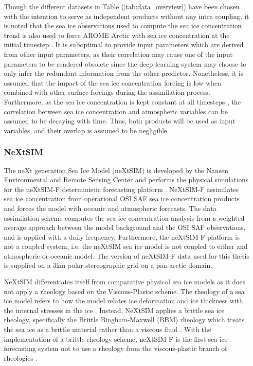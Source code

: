 \documentclass[../main/thesis.tex]{subfiles}
\begin{document}
Though the different datasets in Table (\ref{tab:data_overview}) have been chosen with the intention to serve as independent products without any intra coupling, it is noted that the sea ice observations used to compute the sea ice concentration trend \citep{Tonboe2017} is also used to force AROME Arctic with sea ice concentration at the initial timestep \citep{Mueller2017}. It is suboptimal to provide input parameters which are derived from other input parameters, as their correlation may cause one of the input parameters to be rendered obsolete since the deep learning system may choose to only infer the redundant information from the other predictor. Nonetheless, it is assumed that the impact of the sea ice concentration forcing is low when combined with other surface forcings during the assimilation process. Furthermore, as the sea ice concentration is kept constant at all timesteps \citep{Mueller2017}, the correlation between sea ice concentration and atmospheric variables can be assumed to be decaying with time. Thus, both products will be used as input variables, and their overlap is assumed to be negligible.


\subsubsection{NeXtSIM}
\label{sec:nextsim}
The neXt generation Sea Ice Model (neXtSIM) is developed by the Nansen Environmental and Remote Sensing Center and performs the physical simulations for the neXtSIM-F deterministic forecasting platform \citep{Williams2021}. NeXtSIM-F assimilates sea ice concentration from operational OSI SAF sea ice concentration products \citep{Tonboe2017, Lavelle2016} and forces the model with oceanic and atmospheric forecasts. The data assimilation scheme computes the sea ice concentration analysis from a weighted average approach between the model background and the OSI SAF observations, and is applied with a daily frequency. Furthermore, the neXtSIM-F platform is not a coupled system, i.e. the neXtSIM sea ice model is not coupled to either and atmospheric or oceanic model. The version of neXtSIM-F data used for this thesis is supplied on a 3km polar stereographic grid on a pan-arctic domain. 

NeXtSIM differentiates itself from comparative physical sea ice models as it does not apply a rheology based on the Viscous-Plastic scheme. The rheology of a sea ice model refers to how the model relates ice deformation and ice thickness with the internal stresses in the ice \citep{Hibler1979}. Instead, NeXtSIM applies a brittle sea ice rheology, specifically the Brittle Bingham-Maxwell (BBM) rheology which treats the sea ice as a brittle material rather than a viscous fluid \citep{Olason2022}. With the implementation of a brittle rheology scheme, neXtSIM-F is the first sea ice forecasting system not to use a rheology from the viscous-plastic branch of rheologies \citep{Williams2021}.
\end{document}
